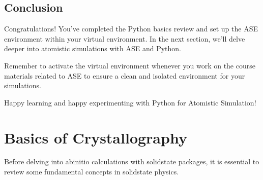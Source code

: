 \documentclass[letterpaper,10pt,english]{sphinxmanual}
\begin{document}
\begin{sphinxVerbatim}[commandchars=\\\{\}]
   

    
  
 
\end{sphinxVerbatim}


\section{Conclusion}
\label{\detokenize{basics/basics:conclusion}}
\sphinxAtStartPar
Congratulations! You’ve completed the Python basics review and set up the ASE environment within your virtual environment. In the next section, we’ll delve deeper into atomistic simulations with ASE and Python.

\sphinxAtStartPar
Remember to activate the virtual environment whenever you work on the course materials related to ASE to ensure a clean and isolated environment for your simulations.

\sphinxAtStartPar
Happy learning and happy experimenting with Python for Atomistic Simulation!

\sphinxstepscope


\chapter{Basics of Crystallography}
\label{\detokenize{crystal/crystal:basics-of-crystallography}}\label{\detokenize{crystal/crystal::doc}}
\sphinxAtStartPar
Before delving into ab\sphinxhyphen{}initio calculations with solid\sphinxhyphen{}state packages, it is essential to review some fundamental concepts in solid\sphinxhyphen{}state physics.
\end{document}
